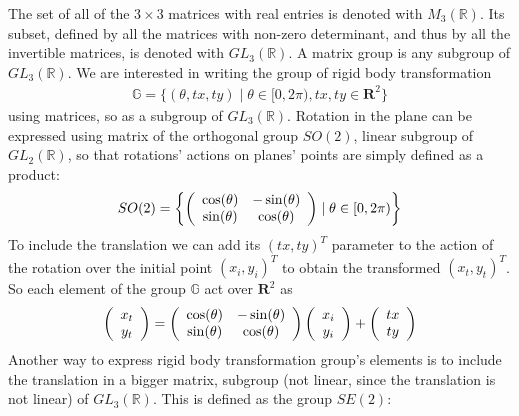 The set of all of the $3\times 3$  matrices with real entries is denoted with $M_{3}(\mathbb{R})$. 
Its subset, defined by all the matrices with non-zero determinant, and thus by all the invertible matrices, is denoted with $GL_3 (\mathbb{R})$. A matrix group is any subgroup of  $GL_3 (\mathbb{R})$.
We are interested in writing the group of rigid body transformation 
\begin{align*}
\mathbb{G} =
\{ (\theta, tx, ty) \mid \theta \in [0, 2\pi),   tx, ty \in\mathbf{R}^2  \}
\end{align*}
using matrices, so as a subgroup of $GL_3 (\mathbb{R})$.
Rotation in the plane can be expressed using matrix of the orthogonal group $SO(2)$, linear subgroup of $GL_2 (\mathbb{R})$, so that rotations' actions on planes' points are simply defined as a product: 
\begin{align*}
SO(2) = 
\left \{
\left (
\begin{array} {c c }
\cos(\theta) & - \sin(\theta) \\
\sin(\theta) & \cos(\theta) 
\end{array}
\right )
\mid
\theta \in  [0, 2\pi)
\right \}
\end{align*}
To include the translation we can add its $(tx, ty)^{T}$ parameter to the action of the rotation over the initial point $(x_{i}, y_{i})^{T}$ to obtain the transformed $(x_{t}, y_{t})^{T}$. So each element of the group $\mathbb{G}$ act over $\mathbf{R}^2$ as
\begin{align*}
\left (  
\begin{array} {c }
x_{t} \\
y_{t}
\end{array}
 \right ) 
 = 
\left (
\begin{array} {c c }
\cos(\theta) & - \sin(\theta) \\
\sin(\theta) & \cos(\theta) 
\end{array}
\right )
\left (  
\begin{array} {c }
x_{i} \\
y_{i}
\end{array}
\right ) 
+
\left (  
\begin{array} {c }
tx \\
ty
\end{array}
\right ) 
\end{align*}
Another way to express rigid body transformation group's elements is to include the translation in a bigger matrix, subgroup (not linear, since the translation is not linear) of $GL_3 (\mathbb{R})$. This is defined as the group $SE(2)$:
